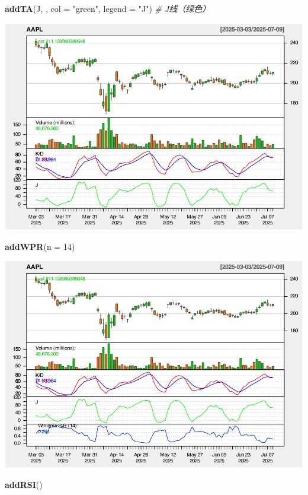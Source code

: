 \documentclass[]{ctexbook}
\newenvironment{Shaded}{\begin{snugshade}}{\end{snugshade}}
\newcommand{\AttributeTok}[1]{\textcolor[rgb]{0.13,0.29,0.53}{#1}}
\newcommand{\CommentTok}[1]{\textcolor[rgb]{0.56,0.35,0.01}{\textit{#1}}}
\newcommand{\DecValTok}[1]{\textcolor[rgb]{0.00,0.00,0.81}{#1}}
\newcommand{\FunctionTok}[1]{\textcolor[rgb]{0.13,0.29,0.53}{\textbf{#1}}}
\newcommand{\NormalTok}[1]{#1}
\newcommand{\StringTok}[1]{\textcolor[rgb]{0.31,0.60,0.02}{#1}}
\begin{document}
\begin{Shaded}
\begin{Highlighting}[]
\FunctionTok{addTA}\NormalTok{(J, , }\AttributeTok{col =} \StringTok{"green"}\NormalTok{, }\AttributeTok{legend =} \StringTok{"J"}\NormalTok{)  }\CommentTok{\# J线（绿色）}
\end{Highlighting}
\end{Shaded}

\includegraphics[width=0.9\linewidth]{quantmod_files/figure-latex/wpr_2-4}

\begin{Shaded}
\begin{Highlighting}[]
\FunctionTok{addWPR}\NormalTok{(}\AttributeTok{n =} \DecValTok{14}\NormalTok{)}
\end{Highlighting}
\end{Shaded}

\includegraphics[width=0.9\linewidth]{quantmod_files/figure-latex/wpr_2-5}

\begin{Shaded}
\begin{Highlighting}[]
\FunctionTok{addRSI}\NormalTok{()}
\end{Highlighting}
\end{Shaded}
\end{document}
